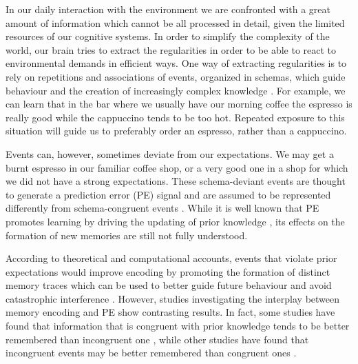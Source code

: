 \documentclass[a4paper,12pt]{article} 			%
\begin{document}

In our daily interaction with the environment we are confronted with a great amount of information which cannot be all processed in detail, given the limited resources of our cognitive systems. In order to simplify the complexity of the world, our brain tries to extract the regularities in order to be able to react to environmental demands in efficient ways. One way of extracting regularities is to rely on repetitions and associations of events, organized in schemas, which guide behaviour and the creation of increasingly complex knowledge \citep{Ghosh2014, Tse2007, VanKesteren2012}. For example, we can learn that in the bar where we usually have our morning coffee the espresso is really good while the cappuccino tends to be too hot. Repeated exposure to this situation will guide us to preferably order an espresso, rather than a cappuccino.\par 
Events can, however, sometimes deviate from our expectations. We may get a burnt espresso in our familiar coffee shop, or a very good one in a shop for which we did not have a strong expectations. These schema-deviant events are thought to generate a prediction error (PE) signal and are assumed to be represented differently from schema-congruent events \citep{Henson2010, VanKesteren2012}. While it is well known that PE promotes learning by driving the updating of prior knowledge \citep{Ergo2020, Friston2018}⁠, its effects on the formation of new memories are still not fully understood. \par
According to theoretical and computational accounts, events that violate prior expectations would improve encoding by promoting the formation of  distinct memory traces which can be used to better guide future behaviour and avoid catastrophic interference \citep{McClelland1995a, VanKesteren2012}. However, studies investigating the interplay between memory encoding and PE show contrasting results. In fact, some studies have found that information that is congruent with prior knowledge tends to be better remembered than incongruent one \citep{Bein2015,BrodGarvinShingYee2019}⁠, while other studies have found that incongruent events may be better remembered than congruent ones \citep{Greve2017,Kafkas2018}.\par
\end{document}
